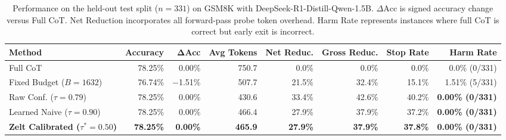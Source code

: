 \documentclass[11pt]{article}
\begin{document}
\begin{table}[ht]
\centering
\small
\begin{tabular}{lrrrrrrr}
\toprule
\textbf{Method} & \textbf{Accuracy} & $\boldsymbol{\Delta}$\textbf{Acc} & \textbf{Avg Tokens} & \textbf{Net Reduc.} & \textbf{Gross Reduc.} & \textbf{Stop Rate} & \textbf{Harm Rate} \\
\midrule
Full CoT & 78.25\% & 0.00\% & 750.7 & 0.0\% & 0.0\% & 0.0\% & 0.0\% (0/331) \\
Fixed Budget ($B{=}1632$) & 76.74\% & $-$1.51\% & 507.7 & 21.5\% & 32.4\% & 15.1\% & 1.51\% (5/331) \\
Raw Conf. ($\tau{=}0.79$) & 78.25\% & 0.00\% & 430.6 & 33.4\% & 42.6\% & 40.2\% & \textbf{0.00\% (0/331)} \\
Learned Naive ($\tau{=}0.90$) & 78.25\% & 0.00\% & 466.4 & 27.9\% & 37.9\% & 37.2\% & \textbf{0.00\% (0/331)} \\
\textbf{Zelt Calibrated ($\tau^*{=}0.50$)} & \textbf{78.25\%} & \textbf{0.00\%} & \textbf{465.9} & \textbf{27.9\%} & \textbf{37.9\%} & \textbf{37.8\%} & \textbf{0.00\% (0/331)} \\
\bottomrule
\end{tabular}
\caption{Performance on the held-out test split ($n=331$) on GSM8K with DeepSeek-R1-Distill-Qwen-1.5B. $\Delta\mathrm{Acc}$ is signed accuracy change versus Full CoT. Net Reduction incorporates all forward-pass probe token overhead. Harm Rate represents instances where full CoT is correct but early exit is incorrect.}
\label{tab:main_results}
\end{table}
\end{document}
